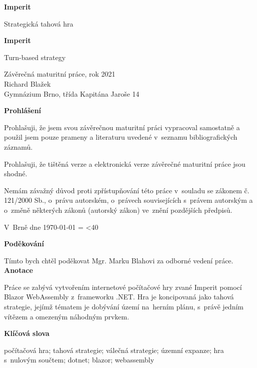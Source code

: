\documentclass[a4paper,12pt]{article}
\author{Richard Blažek}
\makeatletter
\newcommand{\repeatchar}[2]{%
  \begingroup
  \my@repeat@count=\z@
  \@whilenum\my@repeat@count<#1\do{#2\advance\my@repeat@count\@ne}%
  \endgroup
}
\makeatother
\begin{document}
\begin{titlepage}
    \begin{center}

	\vspace*{3cm}            
	\Huge
	\textbf{Imperit}
            
	\vspace{0.5cm}
	\LARGE
	Strategická tahová hra
        
	\vspace*{1cm}
	\Huge
	\textbf{Imperit}
            
	\vspace{0.5cm}
	\LARGE
	Turn-based strategy
            
	\vfill
            
	\large
        Závěrečná maturitní práce, rok 2021\\
	Richard Blažek\\
	Gymnázium Brno, třída Kapitána Jaroše 14
    \end{center}
\end{titlepage}
\thispagestyle{empty}
\Large\textbf{Prohlášení}\normalsize

Prohlašuji, že jsem svou závěrečnou maturitní práci vypracoval samostatně a použil jsem pouze prameny a literaturu uvedené v~seznamu bibliografických záznamů.

Prohlašuji, že tištěná verze a elektronická verze závěrečné maturitní práce jsou shodné.

Nemám závažný důvod proti zpřístupňování této práce v~souladu se zákonem č. 121/2000 Sb., o~právu autorském, o~právech souvisejících s~právem autorským a o~změně některých zákonů (autorský zákon) ve~znění pozdějších předpisů. 

V~Brně dne \today{} \repeatchar{40}{.}
\newpage
\thispagestyle{empty}
\Large\textbf{Poděkování}\normalsize

Tímto bych chtěl poděkovat Mgr. Marku Blahovi za odborné vedení práce.
\newpage
\thispagestyle{empty}
\Large\textbf{Anotace}\normalsize

Práce se zabývá vytvořením internetové počítačové hry zvané Imperit pomocí Blazor WebAssembly z~frameworku .NET. Hra je koncipovaná jako tahová strategie, jejímž tématem je dobývání území na~herním plánu, s~právě jedním vítězem a omezeným ná\-hod\-ným prvkem.

\Large\textbf{Klíčová slova}\normalsize

počítačová hra; tahová strategie; válečná strategie; územní expanze; hra s~nulovým sou\-čtem; dotnet; blazor; webassembly
\end{document}
